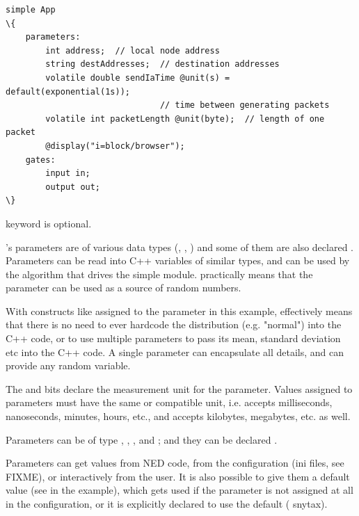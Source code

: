 \begin{Verbatim}[commandchars=\\\{\}]
simple App
\{
    parameters:
        int address;  // local node address
        string destAddresses;  // destination addresses
        volatile double sendIaTime @unit(s) = default(exponential(1s));
                               // time between generating packets
        volatile int packetLength @unit(byte);  // length of one packet
        @display("i=block/browser");
    gates:
        input in;
        output out;
\}
\end{Verbatim}

 keyword is optional.

's parameters are of various data types (, ,
) and some of them are also declared . Parameters
can be read into C++ variables of similar types, and can be used by the
algorithm that drives the simple module.  practically means
that the parameter can be used as a source of random numbers.

\begin{note}
    With constructs like  assigned to the 
    parameter in this example,  effectively means that
    there is no need to ever hardcode the distribution (e.g. "normal")
    into the C++ code, or to use multiple parameters to pass its mean,
    standard deviation etc into the C++ code. A single parameter can
    encapsulate all details, and can provide any random variable.
\end{note}

The  and  bits declare the measurement unit
for the parameter. Values assigned to parameters must have the same or
compatible unit, i.e.  accepts milliseconds, nanoseconds,
minutes, hours, etc., and  accepts kilobytes, megabytes,
etc. as well.

Parameters can be of type , , , 
and ; and they can be declared .

Parameters can get values from NED code, from the configuration (ini files, see
FIXME), or interactively from the user.
It is also possible to give them a default value (see 
in the example), which gets used if the parameter is not assigned at all in
the configuration, or it is explicitly declared to use the default
( snytax).


